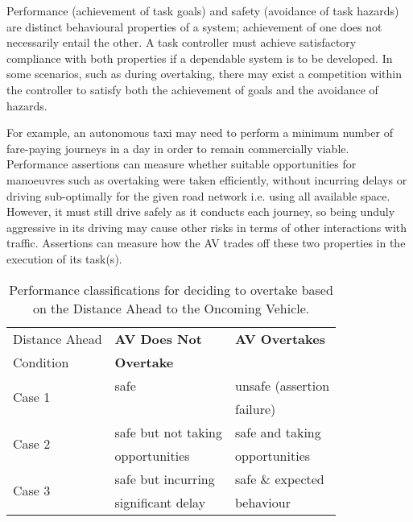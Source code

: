 Performance (achievement of task goals) and safety (avoidance of task hazards) are distinct behavioural properties of a system; achievement of one does not necessarily entail the other. A task controller must achieve satisfactory compliance with both properties if a dependable system is to be developed. In some scenarios, such as during overtaking, there may exist a competition within the controller to satisfy both the achievement of goals and the avoidance of hazards. 

For example, an autonomous taxi may need to perform a minimum number of fare-paying journeys in a day in order to remain commercially viable. Performance assertions can measure whether suitable opportunities for manoeuvres such as overtaking were taken efficiently, without incurring delays or driving sub-optimally for the given road network i.e. using all available space. However, it must still drive safely as it conducts each journey, so being unduly aggressive in its driving may cause other risks in terms of other interactions with traffic. Assertions can measure how the AV trades off these two properties in the execution of its task(s). 

\begin{table}[]
\centering
\begin{tabular}{|p{2.3cm}|p{2.3cm}|p{2.3cm}|}
\hline
\multicolumn{1}{|l|}{Distance Ahead} & \multicolumn{1}{l|}{\textbf{AV Does Not }} & \multicolumn{1}{l|}{\textbf{AV Overtakes}} \\ 
Condition & \textbf{Overtake} & \\
\hline
\multirow{2}{*}{Case 1} & safe & unsafe (assertion \\
& & failure) \\
\hline
\multirow{2}{*}{Case 2} & safe but not taking & safe and taking\\ 
& opportunities & opportunities\\
\hline
\multirow{2}{*}{Case 3} & safe but incurring  & safe \& expected  \\ 
& significant delay & behaviour\\
\hline
\end{tabular}
\caption{Performance classifications for deciding to overtake based on the Distance Ahead to the Oncoming Vehicle.}
\label{performance_metric_table}
\end{table}

